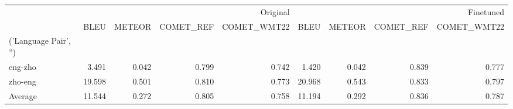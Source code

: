 \begin{tabular}{lrrrrrrrr}
\toprule
 & \multicolumn{4}{r}{Original} & \multicolumn{4}{r}{Finetuned} \\
 & BLEU & METEOR & COMET_REF & COMET_WMT22 & BLEU & METEOR & COMET_REF & COMET_WMT22 \\
('Language Pair', '') &  &  &  &  &  &  &  &  \\
\midrule
eng-zho & 3.491 & 0.042 & 0.799 & 0.742 & 1.420 & 0.042 & 0.839 & 0.777 \\
zho-eng & 19.598 & 0.501 & 0.810 & 0.773 & 20.968 & 0.543 & 0.833 & 0.797 \\
Average & 11.544 & 0.272 & 0.805 & 0.758 & 11.194 & 0.292 & 0.836 & 0.787 \\
\bottomrule
\end{tabular}
